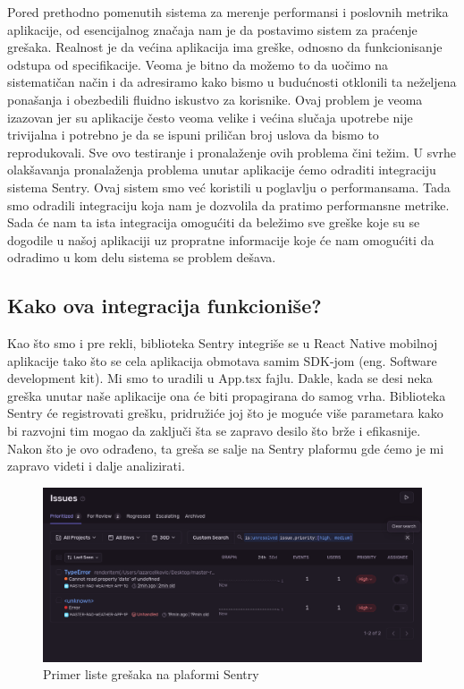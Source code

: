 \documentclass[12pt,oneside]{memoir}
\begin{document}
Pored prethodno pomenutih sistema za merenje performansi i poslovnih metrika aplikacije, od esencijalnog značaja nam je da postavimo sistem za praćenje grešaka. Realnost je da većina aplikacija ima greške, odnosno da funkcionisanje odstupa od specifikacije. Veoma je bitno da možemo to da uočimo na sistematičan način i da adresiramo kako bismo u budućnosti otklonili ta neželjena ponašanja i obezbedili fluidno iskustvo za korisnike. Ovaj problem je veoma izazovan jer su aplikacije često veoma velike i većina slučaja upotrebe nije trivijalna i potrebno je da se ispuni priličan broj uslova da bismo to reprodukovali. Sve ovo testiranje i pronalaženje ovih problema čini težim. U svrhe olakšavanja pronalaženja problema unutar aplikacije ćemo odraditi integraciju sistema Sentry. Ovaj sistem smo već koristili u poglavlju o performansama. Tada smo odradili integraciju koja nam je dozvolila da pratimo performansne metrike. Sada će nam ta ista integracija omogućiti da beležimo sve greške koje su se dogodile u našoj aplikaciji uz propratne informacije koje će nam omogućiti da odradimo u kom delu sistema se problem dešava.

\subsection{Kako ova integracija funkcioniše?}

Kao što smo i pre rekli, biblioteka Sentry integriše se u React Native mobilnoj aplikacije tako što se cela aplikacija obmotava samim SDK-jom (eng. Software development kit). Mi smo to uradili u App.tsx fajlu. Dakle, kada se desi neka greška unutar naše aplikacije ona će biti propagirana do samog vrha. Biblioteka Sentry će registrovati grešku, pridružiće joj što je moguće više parametara kako bi razvojni tim mogao da zaključi šta se zapravo desilo što brže i efikasnije. Nakon što je ovo odrađeno, ta greša se salje na Sentry plaformu gde ćemo je mi zapravo videti i dalje analizirati.

\begin{figure}[h!]
\centering
\includegraphics[scale=0.30]{docs/images/chapterSeven/sentryErrorLogs.png}
\caption{Primer liste grešaka na plaformi Sentry}
\label{fig:eventUsage}
\end{figure}
\end{document}
